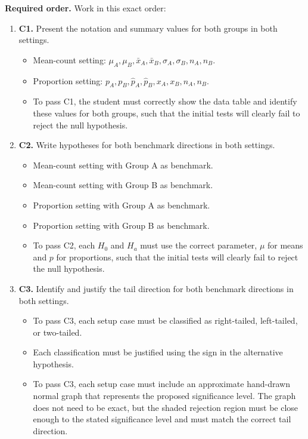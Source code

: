 \documentclass[12pt]{article}
\begin{document}
\textbf{Required order.} Work in this exact order:
\begin{enumerate}
	\item \textbf{C1.} Present the notation and summary values for both groups in both settings.
	\begin{itemize}
		\item Mean-count setting: \(\mu_A,\mu_B,\bar{x}_A,\bar{x}_B,\sigma_A,\sigma_B,n_A,n_B\).
		\item Proportion setting: \(p_A,p_B,\hat p_A,\hat p_B,x_A,x_B,n_A,n_B\).
		\item To pass C1, the student must correctly show the data table and identify these values for both groups, such that the initial tests will clearly fail to reject the null hypothesis.
	\end{itemize}
	
	\item \textbf{C2.} Write hypotheses for both benchmark directions in both settings.
	\begin{itemize}
		\item Mean-count setting with Group A as benchmark.
		\item Mean-count setting with Group B as benchmark.
		\item Proportion setting with Group A as benchmark.
		\item Proportion setting with Group B as benchmark.
		\item To pass C2, each \(H_0\) and \(H_a\) must use the correct parameter, \(\mu\) for means and \(p\) for proportions, such that the initial tests will clearly fail to reject the null hypothesis.
	\end{itemize}
	
	\item \textbf{C3.} Identify and justify the tail direction for both benchmark directions in both settings.
	\begin{itemize}
		\item To pass C3, each setup case must be classified as right-tailed, left-tailed, or two-tailed.
		\item Each classification must be justified using the sign in the alternative hypothesis.
		\item To pass C3, each setup case must include an approximate hand-drawn normal graph that represents the proposed significance level. The graph does not need to be exact, but the shaded rejection region must be close enough to the stated significance level and must match the correct tail direction.
	\end{itemize}
	

\end{enumerate}
\end{document}
